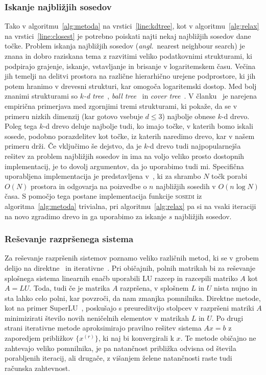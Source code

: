 \documentclass[12pt,a4paper,twoside]{article}
\theoremstyle{definition} %
\theoremstyle{plain} %
\numberwithin{equation}{section}
\newcommand{\ang}[1]{(\hspace{-1.5px}\textit{angl.}\ #1)}
\begin{document}
\subsubsection{Iskanje najbližjih sosedov}

Tako v algoritmu~\ref{alg:metoda} na vrstici~\ref{line:kdtree}, kot v algoritmu~\ref{alg:relax} na
vrstici~\ref{line:closest} je potrebno poiskati najti nekaj najbližjih sosedov dane točke. Problem
iskanja najbližjih sosedov \ang{nearest neighbour search} je znana in dobro raziskana tema z
razvitimi veliko podatkovnimi strukturami, ki podpirajo grajenje, iskanje, vstavljanje in brisanje v
logaritemskem času. Večina jih temelji na delitvi prostora na različne hierarhično urejene
podprostore, ki jih potem hranimo v drevesni strukturi, kar omogoča logaritemski dostop. Med
bolj znanimi strukturami so \emph{$k$-d tree}~\cite{moore1991intoductory}, \emph{ball
tree}~\cite{omohundro1989five} in \emph{cover tree}~\cite{beygelzimer2006cover}. V
članku~\cite{kibriya2007empirical} je narejena empirična primerjava med zgornjimi tremi strukturami,
ki pokaže, da se v primeru nizkih dimenzij (kar gotovo vsebuje $d \leq 3$) najbolje obnese
$k$-d drevo. Poleg tega $k$-d drevo deluje najbolje tudi, ko imajo točke, v katerih
bomo iskali sosede, podobno porazdelitev kot točke, iz katerih naredimo drevo, kar v našem
primeru drži. Če vključimo še dejstvo, da je $k$-d drevo tudi najpopularnejša rešitev za
problem najbližjih sosedov in ima na voljo veliko prosto dostopnih implementacij, je to dovolj
argumentov, da jo uporabimo tudi mi. Specifična uporabljena implementacija je predstavljena
v~\cite{mount1998ann}, ki za shrambo $N$ točk porabi $O(N)$ prostora in odgovarja na poizvedbe o $n$
najbližjih sosedih v $O(n\log N)$ časa. S pomočjo tega postane implementacija funkcije
\textsc{sosedi} iz algoritma~\ref{alg:metoda} trivialna, pri algoritmu~\ref{alg:relax} pa si na
vsaki iteraciji na novo zgradimo drevo in ga uporabimo za iskanje $s$ najbližjih sosedov.

\subsubsection{Reševanje razpršenega sistema}
\label{sec:solve-sparse}
Za reševanje razpršenih sistemov poznamo veliko različnih metod, ki se v grobem delijo na
direktne~\cite{davis2006direct} in iterativne~\cite{saad2003iterative}. Pri običajnih, polnih
matrikah bi za reševanje splošnega sistema linearnih enačb uporabili LU razcep in razcepili matriko
$A$ kot $A = LU$. Toda, tudi če je matrika $A$ razpršena, v splošnem $L$ in $U$ nista nujno in sta
lahko celo polni, kar povzroči, da nam zmanjka pomnilnika. Direktne metode, kot na primer
SuperLU~\cite{li2005overview}, poskušajo s preureditvijo stolpcev v razpršeni matriki $A$
minimizirati število novih neničelnih elementov v matrikah $L$ in $U$. Po drugi strani iterativne
metode aproksimirajo pravilno rešitev sistema $Ax=b$ z zaporedjem približkov $\{x^{(r)}\}$, ki naj
bi konvergirali k $x$. Te metode običajno ne zahtevajo veliko pomnilnika, je pa natančnost približka
odvisna od števila porabljenih iteracij, ali drugače, z višanjem želene natančnosti raste tudi
računska zahtevnost.
\end{document}
